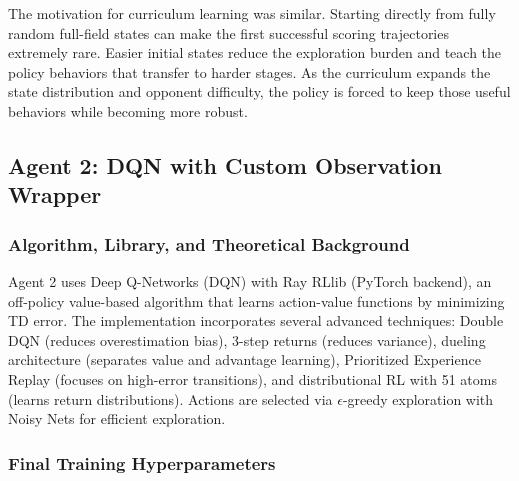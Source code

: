 \documentclass{article}
\begin{document}
The motivation for curriculum learning was similar. Starting directly from fully random full-field states can make the first successful scoring trajectories extremely rare. Easier initial states reduce the exploration burden and teach the policy behaviors that transfer to harder stages. As the curriculum expands the state distribution and opponent difficulty, the policy is forced to keep those useful behaviors while becoming more robust.

\subsection{Agent 2: DQN with Custom Observation Wrapper}

\subsubsection{Algorithm, Library, and Theoretical Background}

Agent 2 uses Deep Q-Networks (DQN) with Ray RLlib (PyTorch backend), an off-policy value-based algorithm that learns action-value functions by minimizing TD error. The implementation incorporates several advanced techniques: Double DQN (reduces overestimation bias), 3-step returns (reduces variance), dueling architecture (separates value and advantage learning), Prioritized Experience Replay (focuses on high-error transitions), and distributional RL with 51 atoms (learns return distributions). Actions are selected via $\epsilon$-greedy exploration with Noisy Nets for efficient exploration.

\subsubsection{Final Training Hyperparameters}
\end{document}
